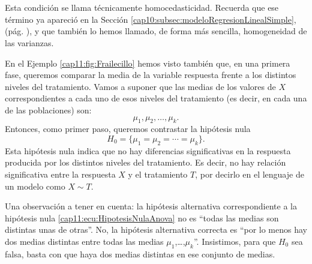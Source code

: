 \paragraph*{}\label{cap11:lugar:homocedasticidad}
        \\[3mm]
Esta condición se llama técnicamente {\sf homocedasticidad}. Recuerda que ese término ya  apareció en la Sección \ref{cap10:subsec:modeloRegresionLinealSimple}, (pág. \pageref{cap10:subsec:modeloRegresionLinealSimple}), y que también lo hemos llamado, de forma más sencilla, {\sf homogeneidad de las varianzas}.

En el Ejemplo \ref{cap11:fig:Frailecillo} hemos visto también que, en una primera fase, queremos comparar la media de la variable respuesta frente a los distintos niveles del tratamiento. Vamos a suponer que las medias de los valores de $X$ correspondientes a cada uno de esos niveles del tratamiento (es decir, en cada una de las poblaciones) son:
    \[\mu_1,\mu_2,\ldots,\mu_k.\]
Entonces, como primer paso, queremos contrastar la hipótesis nula
        \begin{equation}\label{cap11:ecu:HipotesisNulaAnova}
            H_0=\{\mu_1=\mu_2=\cdots=\mu_k\}.
        \end{equation}
Esta hipótesis nula indica que no hay diferencias significativas en la respuesta producida por los distintos niveles del tratamiento. Es decir, no hay relación significativa entre la respuesta $X$ y el tratamiento $T$, por decirlo en el lenguaje de un modelo como $X\sim T$.

Una observación a tener en cuenta: la hipótesis alternativa correspondiente a la hipótesis nula \ref{cap11:ecu:HipotesisNulaAnova} no es ``todas las medias son distintas unas de otras''. No, la hipótesis alternativa correcta es ``por lo menos hay dos medias distintas entre todas las medias $\mu_1$,\ldots,$\mu_k$''. Insistimos, para que $H_0$ sea falsa, basta con que haya dos medias distintas en ese conjunto de medias.

